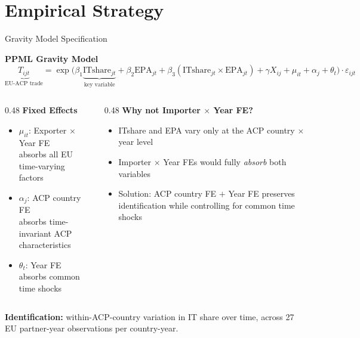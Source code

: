 \documentclass[aspectratio=169,11pt]{beamer}
\begin{document}
\section{Empirical Strategy}

\begin{frame}{Gravity Model Specification}

    \textbf{PPML Gravity Model} \citep{santos-silva2006}
    \[
        \underbrace{T_{ijt}}_{\text{EU-ACP trade}} = \exp\!\bigl(
            \beta_1 \underbrace{\text{ITshare}_{jt}}_{\text{key variable}} +
            \beta_2 \text{EPA}_{jt} +
            \beta_3 (\text{ITshare}_{jt} \times \text{EPA}_{jt}) +
            \gamma X_{ij} + \mu_{it} + \alpha_j + \theta_t
        \bigr) \cdot \varepsilon_{ijt}
    \]

    \medskip

    \begin{columns}[T]
        \begin{column}{0.48\textwidth}
            \textbf{Fixed Effects}
            \begin{itemize}
                \item $\mu_{it}$: Exporter $\times$ Year FE\\
                      \small absorbs all EU time-varying factors
                \item $\alpha_j$: ACP country FE\\
                      \small absorbs time-invariant ACP characteristics
                \item $\theta_t$: Year FE\\
                      \small absorbs common time shocks
            \end{itemize}
        \end{column}
        \begin{column}{0.48\textwidth}
            \textbf{Why not Importer $\times$ Year FE?}
            \begin{itemize}
                \item ITshare and EPA vary only at the ACP country $\times$ year level
                \item Importer $\times$ Year FEs would fully \emph{absorb} both variables
                \item Solution: ACP country FE $+$ Year FE preserves identification while
                      controlling for common time shocks
            \end{itemize}
        \end{column}
    \end{columns}

    \medskip
    \textbf{Identification:} within-ACP-country variation in IT share over time,
    across 27 EU partner-year observations per country-year.

\end{frame}
\end{document}
